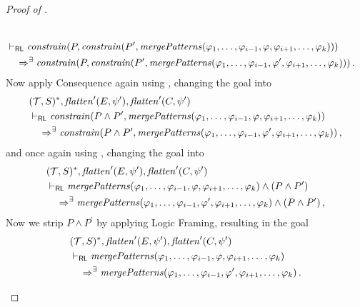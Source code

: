 \begin{proof}[Proof of ]
\begin{enumerate}
\begin{align*}
        \\& \vdash_{\mathsf{RL}}
        \mathit{constrain}(P, \mathit{constrain}(P^\prime, \mathit{mergePatterns}(\varphi_1, \ldots, \varphi_{i-1}, \varphi, \varphi_{i+1}, \ldots, \varphi_k)))
        \\&\quad \Rightarrow^\exists
        \mathit{constrain}(P, \mathit{constrain}(P^\prime, \mathit{mergePatterns}(\varphi_1, \ldots, \varphi_{i-1}, \varphi^\prime, \varphi_{i+1}, \ldots, \varphi_k))) \, .
    \end{align*}
    Now apply Consequence again using ,
    changing the goal into
    \begin{align*}
        & (\mathcal{T}, S)^*, \mathit{flatten}^\prime(E, \psi^\prime), \mathit{flatten}^\prime(C, \psi^\prime)
        \\& \vdash_{\mathsf{RL}}
        \mathit{constrain}(P \land P^\prime, \mathit{mergePatterns}(\varphi_1, \ldots, \varphi_{i-1}, \varphi, \varphi_{i+1}, \ldots, \varphi_k))
        \\&\quad \Rightarrow^\exists
        \mathit{constrain}(P \land P^\prime, \mathit{mergePatterns}(\varphi_1, \ldots, \varphi_{i-1}, \varphi^\prime, \varphi_{i+1}, \ldots, \varphi_k)) \, ,
    \end{align*}
    and once again using , changing the goal into
    \begin{align*}
        & (\mathcal{T}, S)^*, \mathit{flatten}^\prime(E, \psi^\prime), \mathit{flatten}^\prime(C, \psi^\prime)
        \\& \vdash_{\mathsf{RL}}
        \mathit{mergePatterns}(\varphi_1, \ldots, \varphi_{i-1}, \varphi, \varphi_{i+1}, \ldots, \varphi_k)
        \land (P \land P^\prime)
        \\&\quad \Rightarrow^\exists
        \mathit{mergePatterns}(\varphi_1, \ldots, \varphi_{i-1}, \varphi^\prime, \varphi_{i+1}, \ldots, \varphi_k) \land (P \land P^\prime) \, ,
    \end{align*}
    Now we strip $P \land P^\prime$ by applying Logic Framing, resulting in the goal
    \begin{align*}
        & (\mathcal{T}, S)^*, \mathit{flatten}^\prime(E, \psi^\prime), \mathit{flatten}^\prime(C, \psi^\prime)
        \\& \vdash_\RL
        \mathit{mergePatterns}(\varphi_1, \ldots, \varphi_{i-1}, \varphi, \varphi_{i+1}, \ldots, \varphi_k)
        \\&\quad \Rightarrow^\exists
        \mathit{mergePatterns}(\varphi_1, \ldots, \varphi_{i-1}, \varphi^\prime, \varphi_{i+1}, \ldots, \varphi_k) \, .

\end{align*}
\end{enumerate}
\end{proof}
